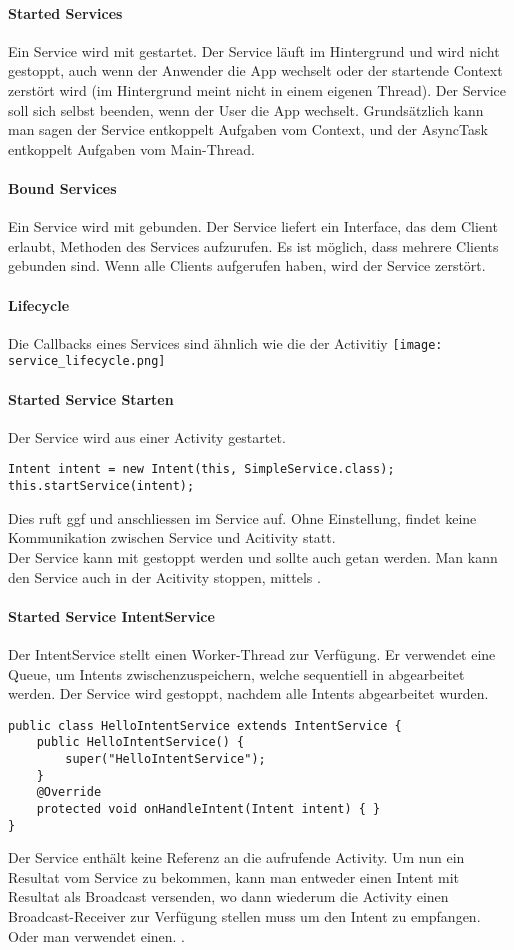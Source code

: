 \paragraph{Started Services} Ein Service wird mit  gestartet. Der Service läuft im Hintergrund und wird nicht gestoppt, auch wenn der Anwender die App wechselt oder der startende Context zerstört wird (im Hintergrund meint nicht in einem eigenen Thread). Der Service soll sich selbst beenden, wenn der User die App wechselt. Grundsätzlich kann man sagen der Service entkoppelt Aufgaben vom Context, und der AsyncTask entkoppelt Aufgaben vom Main-Thread.
\paragraph{Bound Services} Ein Service wird mit  gebunden. Der Service liefert ein Interface, das dem Client erlaubt, Methoden des Services aufzurufen. Es ist möglich, dass mehrere Clients gebunden sind. Wenn alle Clients  aufgerufen haben, wird der Service zerstört.
\paragraph{Lifecycle} Die Callbacks eines Services sind ähnlich wie die der Activitiy
\texttt{[image: service\_lifecycle.png]}
\paragraph{Started Service Starten} Der Service wird aus einer Activity gestartet.
\begin{lstlisting}
Intent intent = new Intent(this, SimpleService.class);
this.startService(intent);
\end{lstlisting}
Dies ruft ggf  und anschliessen  im Service auf. Ohne Einstellung, findet keine Kommunikation zwischen Service und Acitivity statt.\\
Der Service kann mit  gestoppt werden und sollte auch getan werden. Man kann den Service auch in der Acitivity stoppen, mittels .
\paragraph{Started Service IntentService} Der IntentService stellt einen Worker-Thread zur Verfügung. Er verwendet eine Queue, um Intents zwischenzuspeichern, welche sequentiell in  abgearbeitet werden. Der Service wird gestoppt, nachdem alle Intents abgearbeitet wurden.
\begin{lstlisting}
public class HelloIntentService extends IntentService {
    public HelloIntentService() {
        super("HelloIntentService");
    }
    @Override
    protected void onHandleIntent(Intent intent) { }
}
\end{lstlisting}
Der Service enthält keine Referenz an die aufrufende Activity. Um nun ein Resultat vom Service zu bekommen, kann man entweder einen Intent mit Resultat als Broadcast versenden, wo dann wiederum die Activity einen Broadcast-Receiver zur Verfügung stellen muss um den Intent zu empfangen. Oder man verwendet einen. .
